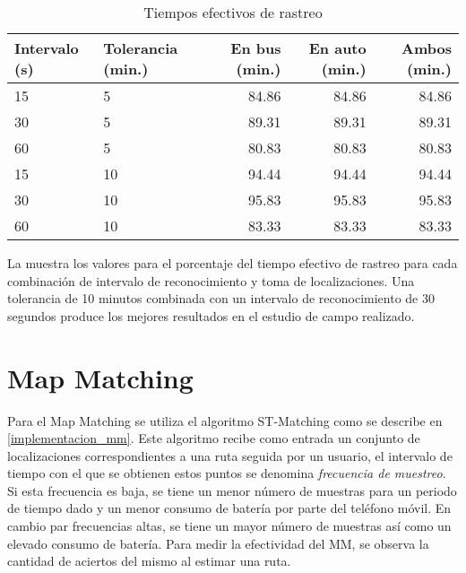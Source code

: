 \begin{table}[h]
  \centering
	\begin{tabular}{llrrr}
	\toprule
	Intervalo (s) & Tolerancia (min.) & En bus (min.) & En auto (min.) & Ambos (min.) \\
	\midrule
	15            & 5                 & 84.86         & 84.86          & 84.86        \\
	30            & 5                 & 89.31         & 89.31          & 89.31        \\
	60            & 5                 & 80.83         & 80.83          & 80.83        \\
	15            & 10                & 94.44         & 94.44          & 94.44        \\
	30            & 10                & 95.83         & 95.83          & 95.83        \\
	60            & 10                & 83.33         & 83.33          & 83.33        \\
	\bottomrule
	\end{tabular}
  \caption{Tiempos efectivos de rastreo}
  \label{tab:prom_tiempo_efectivo_rastreo}
\end{table}

La  muestra los valores para el porcentaje del tiempo efectivo de rastreo para cada combinación de intervalo de reconocimiento y toma de localizaciones. Una tolerancia de 10 minutos combinada con un intervalo de reconocimiento de 30 segundos produce los mejores resultados en el estudio de campo realizado.

\section{Map Matching}

Para el Map Matching se utiliza el algoritmo ST-Matching como se describe en \cref{implementacion_mm}. Este algoritmo recibe como entrada un conjunto de localizaciones correspondientes a una ruta seguida por un usuario, el intervalo de tiempo con el que se obtienen estos puntos se denomina \emph{frecuencia de muestreo}. Si esta frecuencia es baja, se tiene un menor número de muestras para un periodo de tiempo dado y un menor consumo de batería por parte del teléfono móvil. En cambio par frecuencias altas, se tiene un mayor número de muestras así como un elevado consumo de batería. Para medir la efectividad del MM, se observa la cantidad de aciertos del mismo al estimar una ruta.

